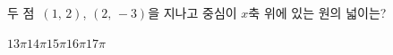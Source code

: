 두 점~$(1,\,2)$, $(2,\,-3)$을 지나고 중심이 $x$축 위에 있는 원의 넓이는?
\begin{choices32}{$13\pi$}{$14\pi$}{$15\pi$}{$16\pi$}{$17\pi$}\end{choices32}
